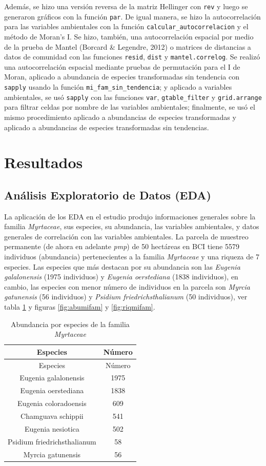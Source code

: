 \documentclass[11pt,]{article}
\begin{document}
Además, se hizo una versión reversa de la matriz Hellinger con
\texttt{rev} y luego se generaron gráficos con la función \texttt{par}.
De igual manera, se hizo la autocorrelación para las variables
ambientales con la función \texttt{calcular\_autocorrelacion} y el
método de Moran's I. Se hizo, también, una autocorrelación espacial por
medio de la prueba de Mantel (Borcard \& Legendre, 2012) o matrices de
distancias a datos de comunidad con las funciones \texttt{resid},
\texttt{dist} y \texttt{mantel.correlog}. Se realizó una autocorrelación
espacial mediante pruebas de permutación para el I de Moran, aplicado a
abundancia de especies transformadas sin tendencia con \texttt{sapply}
usando la función \texttt{mi\_fam\_sin\_tendencia}; y aplicado a
variables ambientales, se usó \texttt{sapply} con las funciones
\texttt{var}, \texttt{gtable\_filter} y \texttt{grid.arrange} para
filtrar celdas por nombre de las variables ambientales; finalmente, se
usó el mismo procedimiento aplicado a abundancias de especies
transformadas y aplicado a abundancias de especies transformadas sin
tendencias.

\section{Resultados}\label{resultados}

\subsection{Análisis Exploratorio de Datos
(EDA)}\label{anuxe1lisis-exploratorio-de-datos-eda}

La aplicación de los EDA en el estudio produjo informaciones generales
sobre la familia \emph{Myrtaceae}, sus especies, su abundancia, las
variables ambientales, y datos generales de correlación con las
variables ambientales. La parcela de muestreo permanente (de ahora en
adelante \emph{pmp}) de 50 hectáreas en BCI tiene 5579 individuos
(abundancia) pertenecientes a la familia \emph{Myrtaceae} y una riqueza
de 7 especies. Las especies que más destacan por su abundancia son las
\emph{Eugenia galalonensis} (1975 individuos) y \emph{Eugenia
oerstediana} (1838 individuos), en cambio, las especies con menor número
de individuos en la parcela son \emph{Myrcia gatunensis} (56 individuos)
y \emph{Psidium friedrichsthalianum} (50 individuos), ver tabla
\ref{tab:specabu} y figuras \ref{fig:abumifam} y \ref{fig:riqmifam}.

\begin{longtable}[]{@{}cc@{}}
\caption{\label{tab:specabu} Abundancia por especies de la familia
\emph{Myrtaceae}}\tabularnewline
\toprule
Especies & Número\tabularnewline
\midrule
\endfirsthead
\toprule
Especies & Número\tabularnewline
\midrule
\endhead
Eugenia galalonensis & 1975\tabularnewline
Eugenia oerstediana & 1838\tabularnewline
Eugenia coloradoensis & 609\tabularnewline
Chamguava schippii & 541\tabularnewline
Eugenia nesiotica & 502\tabularnewline
Psidium friedrichsthalianum & 58\tabularnewline
Myrcia gatunensis & 56\tabularnewline
\bottomrule
\end{longtable}
\end{document}
